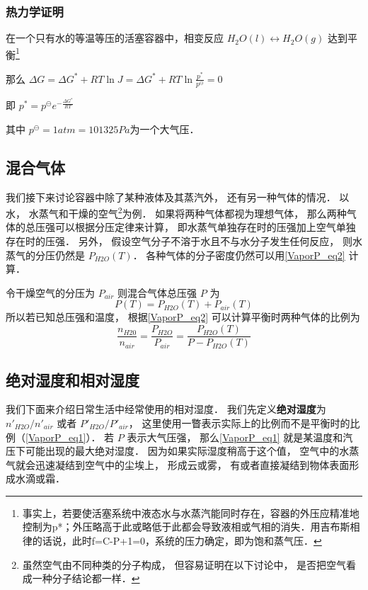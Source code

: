 \subsubsection{热力学证明}
在一个只有水的等温等压的活塞容器中，相变反应 $H_2O(l) \leftrightarrow H_2O(g)$ 达到平衡\footnote{事实上，若要使活塞系统中液态水与水蒸汽能同时存在，容器的外压应精准地控制为p*；外压略高于此或略低于此都会导致液相或气相的消失．用吉布斯相律的话说，此时f=C-P+1=0，系统的压力确定，即为饱和蒸气压．}

那么 $\Delta G = \Delta G^* + RT \ln J = \Delta G^* + RT \ln \frac{p^*}{p^\ominus} =0$

即 $p^* = p^\ominus e^{-\frac{\Delta G^*}{RT}}$

其中 $p^\ominus = 1 atm = 101325 Pa$为一个大气压．

\subsection{混合气体}

我们接下来讨论容器中除了某种液体及其蒸汽外， 还有另一种气体的情况． 以水， 水蒸气和干燥的空气\footnote{虽然空气由不同种类的分子构成， 但容易证明在以下讨论中， 是否把空气看成一种分子结论都一样．}为例． 如果将两种气体都视为理想气体， 那么两种气体的总压强可以根据分压定律来计算， 即水蒸气单独存在时的压强加上空气单独存在时的压强． 另外， 假设空气分子不溶于水且不与水分子发生任何反应， 则水蒸气的分压仍然是 $P_{H2O}(T)$． 各种气体的分子密度仍然可以用\autoref{VaporP_eq2} 计算．

令干燥空气的分压为 $P_{air}$ 则混合气体总压强 $P$ 为
\begin{equation}
P(T) = P_{H2O}(T) + P_{air}(T)
\end{equation}
所以若已知总压强和温度， 根据\autoref{VaporP_eq2} 可以计算平衡时两种气体的比例为
\begin{equation}\label{VaporP_eq1}
\frac{n_{H20}}{n_{air}} = \frac{P_{H2O}}{P_{air}} = \frac{P_{H2O}(T)}{P - P_{H2O}(T)}
\end{equation}

\subsection{绝对湿度和相对湿度}
我们下面来介绍日常生活中经常使用的相对湿度． 我们先定义\textbf{绝对湿度}为 $n'_{H2O}/n'_{air}$ 或者 $P'_{H2O}/P'_{air}$， 这里使用一瞥表示实际上的比例而不是平衡时的比例（\autoref{VaporP_eq1}）． 若 $P$ 表示大气压强， 那么\autoref{VaporP_eq1} 就是某温度和汽压下可能出现的最大绝对湿度． 因为如果实际湿度稍高于这个值， 空气中的水蒸气就会迅速凝结到空气中的尘埃上， 形成云或雾， 有或者直接凝结到物体表面形成水滴或霜．

